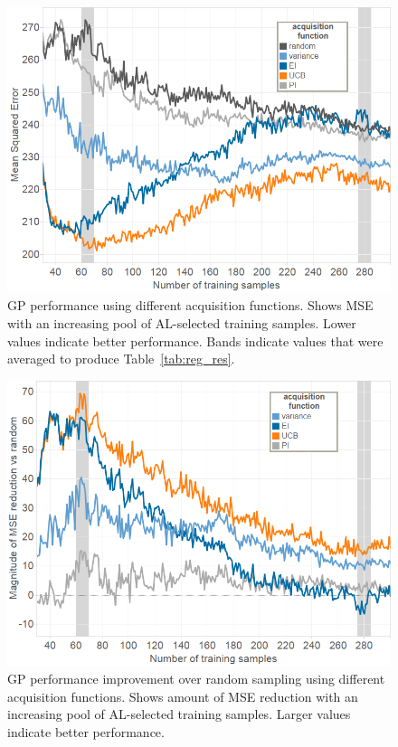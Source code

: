 \documentclass{sig-alternate}
\begin{document}
\begin{figure}[tb]
\centering
\includegraphics[width=\linewidth]{regression_experiment_happy}
\caption{GP performance using different acquisition functions.
Shows MSE with an increasing pool of AL-selected training samples.
Lower values indicate better performance.
Bands indicate values that were averaged to produce Table~\ref{tab:reg_res}.
}
\label{fig:reg_happy}
\end{figure}

\begin{figure}[tb]
\centering
\includegraphics[width=\linewidth]{regression_experiment}
\caption{GP performance improvement over random sampling using different acquisition functions.
Shows amount of MSE reduction with an increasing pool of AL-selected training samples.
Larger values indicate better performance.
}
\label{fig:reg_all}
\end{figure}
\end{document}
